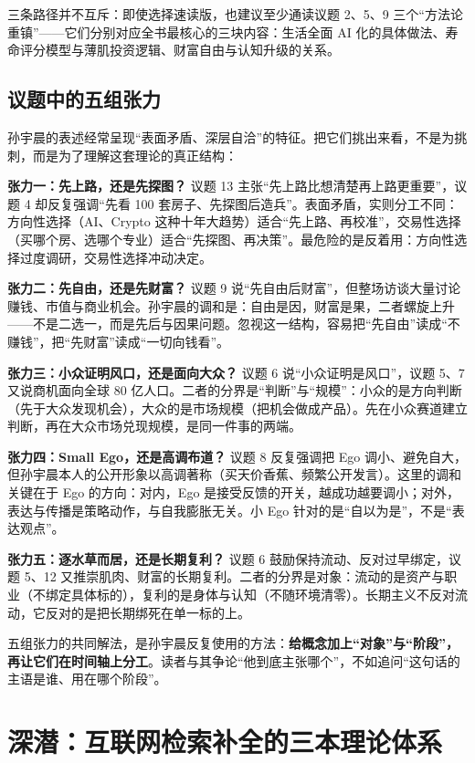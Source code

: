 三条路径并不互斥：即使选择速读版，也建议至少通读议题 2、5、9
三个``方法论重镇''------它们分别对应全书最核心的三块内容：生活全面 AI
化的具体做法、寿命评分模型与薄肌投资逻辑、财富自由与认知升级的关系。

\section{议题中的五组张力}

孙宇晨的表述经常呈现``表面矛盾、深层自洽''的特征。把它们挑出来看，不是为挑刺，而是为了理解这套理论的真正结构：

\textbf{张力一：先上路，还是先探图？} 议题 13
主张``先上路比想清楚再上路更重要''，议题 4 却反复强调``先看 100
套房子、先探图后造兵''。表面矛盾，实则分工不同：方向性选择（AI、Crypto
这种十年大趋势）适合``先上路、再校准''，交易性选择（买哪个房、选哪个专业）适合``先探图、再决策''。最危险的是反着用：方向性选择过度调研，交易性选择冲动决定。

\textbf{张力二：先自由，还是先财富？} 议题 9
说``先自由后财富''，但整场访谈大量讨论赚钱、市值与商业机会。孙宇晨的调和是：自由是因，财富是果，二者螺旋上升------不是二选一，而是先后与因果问题。忽视这一结构，容易把``先自由''读成``不赚钱''，把``先财富''读成``一切向钱看''。

\textbf{张力三：小众证明风口，还是面向大众？} 议题 6
说``小众证明是风口''，议题 5、7 又说商机面向全球 80
亿人口。二者的分界是``判断''与``规模''：小众的是方向判断（先于大众发现机会），大众的是市场规模（把机会做成产品）。先在小众赛道建立判断，再在大众市场兑现规模，是同一件事的两端。

\textbf{张力四：Small Ego，还是高调布道？} 议题 8 反复强调把 Ego
调小、避免自大，但孙宇晨本人的公开形象以高调著称（买天价香蕉、频繁公开发言）。这里的调和关键在于
Ego 的方向：对内，Ego
是接受反馈的开关，越成功越要调小；对外，表达与传播是策略动作，与自我膨胀无关。小
Ego 针对的是``自以为是''，不是``表达观点''。

\textbf{张力五：逐水草而居，还是长期复利？} 议题 6
鼓励保持流动、反对过早绑定，议题 5、12
又推崇肌肉、财富的长期复利。二者的分界是对象：流动的是资产与职业（不绑定具体标的），复利的是身体与认知（不随环境清零）。长期主义不反对流动，它反对的是把长期绑死在单一标的上。

五组张力的共同解法，是孙宇晨反复使用的方法：\textbf{给概念加上``对象''与``阶段''，再让它们在时间轴上分工}。读者与其争论``他到底主张哪个''，不如追问``这句话的主语是谁、用在哪个阶段''。

\chapter{深潜：互联网检索补全的三本理论体系}

